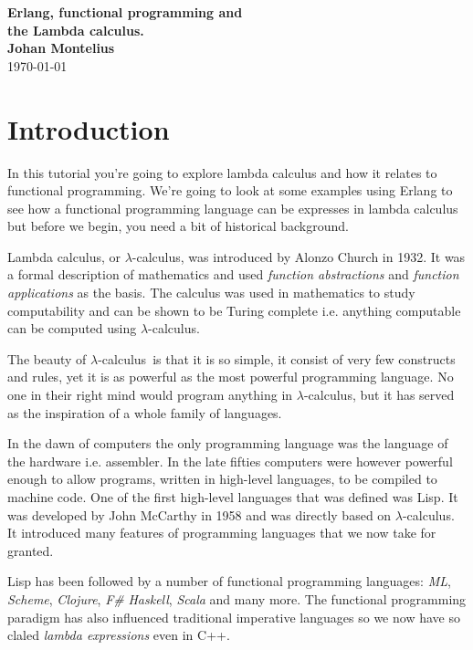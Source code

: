 \documentclass[a4paper,11pt]{article}
\newcommand{\nnsection}[1]{
\section*{#1}
\addcontentsline{toc}{section}{#1}
}
\begin{document}
\begin{center}
\vspace{20pt}
\textbf{\large Erlang, functional programming and\\ the Lambda calculus.}\\
\vspace{10pt}
\textbf{Johan Montelius}\\
\vspace{10pt}
\today{}
\end{center}

\newcommand{\lamc}[0]{$\lambda$-calculus}
\newcommand{\lama}[0]{$\lambda$-abstraction}
\newcommand{\lame}[0]{$\lambda$-expression}
\newcommand{\alphac}[0]{$\alpha$-conversion}
\newcommand{\betar}[0]{$\beta$-reduction}
\newcommand{\etac}[0]{$\eta$-conversion}

\nnsection{Introduction}

In this tutorial you're going to explore lambda calculus and how it
relates to functional programming. We're going to look at some
examples using Erlang to see how a functional programming language can
be expresses in lambda calculus but before we begin, you need a bit of
historical background.

Lambda calculus, or \lamc, was introduced by Alonzo Church in 1932. It
was a formal description of mathematics and used {\em function abstractions}
and {\em function applications} as the basis. The calculus was used in
mathematics to study computability and can be shown to be Turing
complete i.e. anything computable can be computed using \lamc.


The beauty of \lamc\ is that it is so simple, it consist of very few
constructs and rules, yet it is as powerful as the most powerful
programming language. No one in their right mind would program
anything in \lamc, but it has served as the inspiration of a whole
family of languages.

In the dawn of computers the only programming language was the language of
the hardware i.e. assembler. In the late fifties computers were
however powerful enough to allow programs, written in high-level
languages, to be compiled to machine code. One of the first high-level
languages that was defined was Lisp. It was developed by John
McCarthy in 1958 and was directly based on \lamc. It introduced many
features of programming languages that we now take for granted.

Lisp has been followed by a number of functional
programming languages: {\em ML}, {\em Scheme}, {\em Clojure}, {\em
  F\#} {\em Haskell}, {\em Scala} and many more. The functional
programming paradigm has also influenced traditional imperative
languages so we now have so claled {\em lambda expressions} even in C++.
\end{document}

